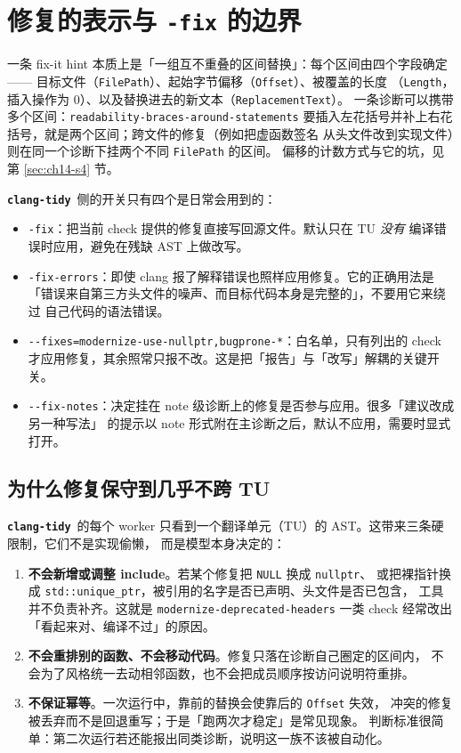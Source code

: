 \documentclass[12pt,a4paper,fontset=fandol]{ctexbook}
\newcommand{\Tp}[1]{\texttt{#1}}
\newcommand{\Opt}[1]{\texttt{-\/-#1}}
\newcommand{\Lib}[1]{\textbf{\texttt{#1}}}
\newcommand{\Tidy}{\Lib{clang-tidy}}
\begin{document}
\section{修复的表示与 \texttt{-fix} 的边界}\label{sec:ch14-s1}

一条 fix-it hint 本质上是「一组互不重叠的区间替换」：每个区间由四个字段确定——
目标文件（\texttt{FilePath}）、起始字节偏移（\texttt{Offset}）、被覆盖的长度
（\texttt{Length}，插入操作为 0）、以及替换进去的新文本（\texttt{ReplacementText}）。
一条诊断可以携带多个区间：\texttt{readability-braces-around-statements}
要插入左花括号并补上右花括号，就是两个区间；跨文件的修复（例如把虚函数签名
从头文件改到实现文件）则在同一个诊断下挂两个不同 \texttt{FilePath} 的区间。
偏移的计数方式与它的坑，见第 \ref{sec:ch14-s4} 节。

\Tidy\ 侧的开关只有四个是日常会用到的：

\begin{itemize}
  \item \texttt{-fix}：把当前 check 提供的修复直接写回源文件。默认只在 TU \emph{没有}
        编译错误时应用，避免在残缺 AST 上做改写。
  \item \texttt{-fix-errors}：即使 clang 报了解释错误也照样应用修复。它的正确用法是
        「错误来自第三方头文件的噪声、而目标代码本身是完整的」，不要用它来绕过
        自己代码的语法错误。
  \item \Opt{fixes=\allowbreak modernize-use-nullptr,bugprone-*}：白名单，只有列出的
        check 才应用修复，其余照常只报不改。这是把「报告」与「改写」解耦的关键开关。
  \item \Opt{fix-notes}：决定挂在 note 级诊断上的修复是否参与应用。很多「建议改成另一种写法」
        的提示以 note 形式附在主诊断之后，默认不应用，需要时显式打开。
\end{itemize}

\subsection*{为什么修复保守到几乎不跨 TU}

\Tidy\ 的每个 worker 只看到一个翻译单元（TU）的 AST。这带来三条硬限制，它们不是实现偷懒，
而是模型本身决定的：

\begin{enumerate}
  \item \textbf{不会新增或调整 include}。若某个修复把 \texttt{NULL} 换成 \texttt{nullptr}、
        或把裸指针换成 \Tp{std::unique\_ptr}，被引用的名字是否已声明、头文件是否已包含，
        工具并不负责补齐。这就是 \texttt{modernize-deprecated-headers} 一类 check
        经常改出「看起来对、编译不过」的原因。
  \item \textbf{不会重排别的函数、不会移动代码}。修复只落在诊断自己圈定的区间内，
        不会为了风格统一去动相邻函数，也不会把成员顺序按访问说明符重排。
  \item \textbf{不保证幂等}。一次运行中，靠前的替换会使靠后的 \texttt{Offset} 失效，
        冲突的修复被丢弃而不是回退重写；于是「跑两次才稳定」是常见现象。
        判断标准很简单：第二次运行若还能报出同类诊断，说明这一族不该被自动化。
\end{enumerate}
\end{document}

